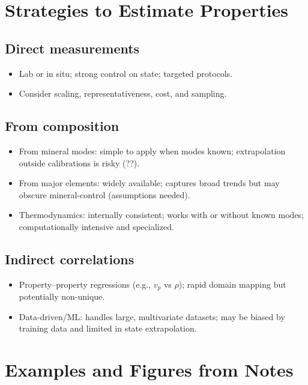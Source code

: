 \documentclass[11pt,a4paper]{article}
\begin{document}
\section{Strategies to Estimate Properties}
\subsection{Direct measurements}
\begin{itemize}
  \item Lab or in situ; strong control on state; targeted protocols.
  \item Consider scaling, representativeness, cost, and sampling.
\end{itemize}

\subsection{From composition}
\begin{itemize}
  \item From mineral modes: simple to apply when modes known; extrapolation outside calibrations is risky (??).
  \item From major elements: widely available; captures broad trends but may obscure mineral-control (assumptions needed).
  \item Thermodynamics: internally consistent; works with or without known modes; computationally intensive and specialized.
\end{itemize}

\subsection{Indirect correlations}
\begin{itemize}
  \item Property--property regressions (e.g., $v_p$ vs $\rho$); rapid domain mapping but potentially non-unique.
  \item Data-driven/ML: handles large, multivariate datasets; may be biased by training data and limited in state extrapolation.
\end{itemize}

\section{Examples and Figures from Notes}
\end{document}
